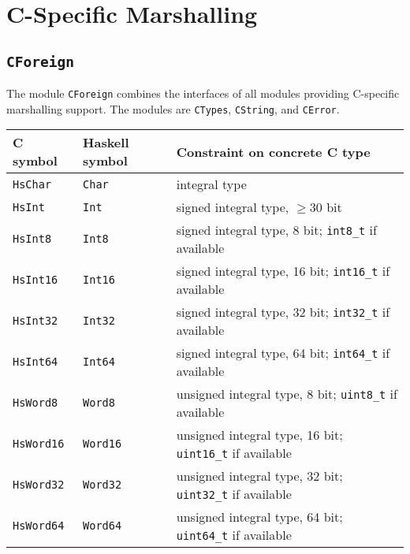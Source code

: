 \documentclass[a4paper,twoside]{article}
\newcommand{\code}[1]{\texttt{#1}}      %
\begin{document}
\newpage
\section{C-Specific Marshalling}
\label{sec:c-marshalling}

\subsection{\code{CForeign}}
\label{sec:CForeign}

The module \code{CForeign} combines the interfaces of all modules providing
C-specific marshalling support.  The modules are \code{CTypes},
\code{CString}, and \code{CError}.

\begin{table}
  \begin{center}
    \begin{tabular}{|l|l|l|}
      \hline
      C symbol          & Haskell symbol & Constraint on concrete C type\\
      \hline\hline
      \code{HsChar}     & \code{Char}    
      & integral type\\
      \hline
      \code{HsInt}      & \code{Int}
      & signed integral type, $\geq30$ bit\\
      \hline
      \code{HsInt8}     & \code{Int8}
      & signed integral type, 8 bit; \code{int8\_t} if available\\
      \hline
      \code{HsInt16}    & \code{Int16}
      & signed integral type, 16 bit; \code{int16\_t} if available\\
      \hline
      \code{HsInt32}    & \code{Int32}
      & signed integral type, 32 bit; \code{int32\_t} if available\\
      \hline
      \code{HsInt64}    & \code{Int64}
      & signed integral type, 64 bit; \code{int64\_t} if available\\ 
      \hline
      \code{HsWord8}    & \code{Word8}
      & unsigned integral type, 8 bit; \code{uint8\_t} if available\\
      \hline
      \code{HsWord16}   & \code{Word16}
      & unsigned integral type, 16 bit; \code{uint16\_t} if available\\
      \hline
      \code{HsWord32}   & \code{Word32}
      & unsigned integral type, 32 bit; \code{uint32\_t} if available\\
      \hline
      \code{HsWord64}   & \code{Word64}
      & unsigned integral type, 64 bit; \code{uint64\_t} if available\\

\end{tabular}
\end{center}
\end{table}
\end{document}
